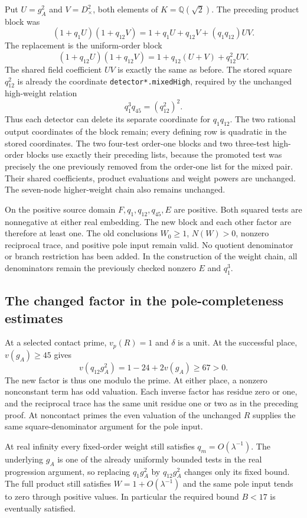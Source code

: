 Put $U=g_A^2$ and $V=D_{\times}^2$, both elements of $K=\mathbb Q(\sqrt2)$.
The preceding product block was
\[
 (1+q_1U)(1+q_{12}V)
 =1+q_1U+q_{12}V+(q_1q_{12})UV.
\]
The replacement is the uniform-order block
\[
 (1+q_{12}U)(1+q_{12}V)
 =1+q_{12}(U+V)+q_{12}^2 UV.
\]
The shared field coefficient $UV$ is exactly the same as before.
The stored square $q_{12}^2$ is already the coordinate
\texttt{detector*.mixedHigh}, required by the unchanged high-weight
relation
\[
 q_1^3q_{45}=(q_{12}^2)^2.
\]
Thus each detector can delete its separate coordinate for $q_1q_{12}$.
The two rational output coordinates of the block remain; every defining
row is quadratic in the stored coordinates. The two four-test order-one
blocks and two three-test high-order blocks use exactly their preceding
lists, because the promoted test was precisely the one previously
removed from the order-one list for the mixed pair. Their shared
coefficients, product evaluations and weight powers are unchanged.
The seven-node higher-weight chain also remains unchanged.

On the positive source domain $F,q_1,q_{12},q_{45},E$ are positive.
Both squared tests are nonnegative at either real embedding. The new
block and each other factor are therefore at least one. The old
conclusions $W_0\ge1$, $N(W)>0$, nonzero reciprocal trace, and positive
pole input remain valid. No quotient denominator or branch restriction
has been added. In the construction of the weight chain, all denominators
remain the previously checked nonzero $E$ and $q_1^3$.

\subsection{The changed factor in the pole-completeness estimates}

At a selected contact prime, $v_p(R)=1$ and $\delta$ is a unit. At the
successful place, $v(g_A)\ge45$ gives
\[
 v(q_{12}g_A^2)=1-24+2v(g_A)\ge67>0.
\]
The new factor is thus one modulo the prime. At either place, a
nonzero nonconstant term has odd valuation. Each inverse factor has
residue zero or one, and the reciprocal trace has the same unit residue
one or two as in the preceding proof. At noncontact primes the even
valuation of the unchanged $R$ supplies the same square-denominator
argument for the pole input.

At real infinity every fixed-order weight still satisfies
$q_m=O(\lambda^{-1})$. The underlying $g_A$ is one of the already
uniformly bounded tests in the real progression argument, so replacing
$q_1g_A^2$ by $q_{12}g_A^2$ changes only its fixed bound. The full product
still satisfies $W=1+O(\lambda^{-1})$ and the same pole input tends to
zero through positive values. In particular the required bound $B<17$
is eventually satisfied.

